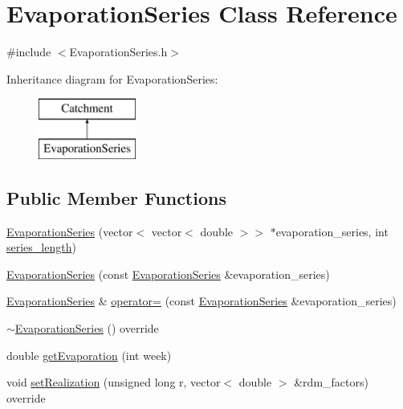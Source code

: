 \hypertarget{classEvaporationSeries}{}\section{Evaporation\+Series Class Reference}
\label{classEvaporationSeries}


{\ttfamily \#include $<$Evaporation\+Series.\+h$>$}

Inheritance diagram for Evaporation\+Series\+:\begin{figure}[H]
\begin{center}
\leavevmode
\includegraphics[height=2.000000cm]{classEvaporationSeries}
\end{center}
\end{figure}
\subsection*{Public Member Functions}
\begin{DoxyCompactItemize}
\item 
\mbox{\hyperlink{classEvaporationSeries_af0903d8555a148f9bf45f915877120b3}{Evaporation\+Series}} (vector$<$ vector$<$ double $>$$>$ $\ast$evaporation\+\_\+series, int \mbox{\hyperlink{classCatchment_a2d4994220f63b876348b4ce4892bc6d3}{series\+\_\+length}})
\item 
\mbox{\hyperlink{classEvaporationSeries_aa8d8cd8bbc0fd5b368b748cb090ad414}{Evaporation\+Series}} (const \mbox{\hyperlink{classEvaporationSeries}{Evaporation\+Series}} \&evaporation\+\_\+series)
\item 
\mbox{\hyperlink{classEvaporationSeries}{Evaporation\+Series}} \& \mbox{\hyperlink{classEvaporationSeries_ad7eb758ce8774ce87732a86c23d24356}{operator=}} (const \mbox{\hyperlink{classEvaporationSeries}{Evaporation\+Series}} \&evaporation\+\_\+series)
\item 
\mbox{\hyperlink{classEvaporationSeries_a201a00eaaadc9c523d544e0d6a4c50e5}{$\sim$\+Evaporation\+Series}} () override
\item 
double \mbox{\hyperlink{classEvaporationSeries_a4d793fbcb73e8fb6c179968130d6fd0a}{get\+Evaporation}} (int week)
\item 
void \mbox{\hyperlink{classEvaporationSeries_a4985ac4c81ec111657861e5750b24c0e}{set\+Realization}} (unsigned long r, vector$<$ double $>$ \&rdm\+\_\+factors) override
\end{DoxyCompactItemize}
